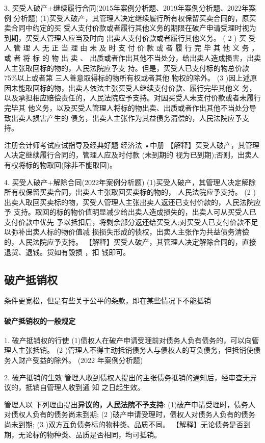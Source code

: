 \documentclass[UTF8,12pt]{ctexart}
\numberwithin{equation}{section} %
\numberwithin{figure}{section}
\numberwithin{table}{section}
\begin{document}
	3. 买受人破产+继续履行合同(2015年案例分析题、2019年案例分析题、2022年案例 分析题) 
	(1)买受人破产，其管理人决定继续履行所有权保留买卖合同的，原买卖合同中约定的买 受人支付价款或者履行其他义务的期限在破产申请受理时视为到期，买受人管理人应当及时向 出卖人支付价款或者履行其他义务。
	( 2 ) 买 受 人 管 理 人 无 正 当 理 由 未 及 时 支 付 价 款 或 者 履 行 完 毕 其 他 义 务 ，或 者 将 标 的 物 出 卖 、 出质或者作出其他不当处分，给出卖人造成损害，出卖人主张取回标的物的，人民法院应予支 持。但是，买受人已支付标的物总价款75\%以上或者第 三人善意取得标的物所有权或者其他 物权的除外。
	(3 )因上述原因未能取回标的物，出卖人依法主张买受人继续支付价款、履行完毕其他义 务，以及承担相应赔偿责任的，人民法院应予支持。对因买受人未支付价款或者未履行完毕其 他义务，以及买受人管理人将标的物出卖、出质或者作出其他不当处分导致出卖人损害产生的 债务，出卖人主张作为其益债务清偿的，人民法院应予支持。
	
	注册会计师考试应试指导及经典好题 经济法 •中册 【解释】买受人破产，其管理人决定继续履行合同的，管理人应及时付款 (未到期的 视为已到期);否则，出卖人有权将标的物取回(除非不能取回)。
	
	4. 买受人破产+解除合同(2022年案例分析题) 
	(1)买受人破产，其管理人决定解除所有权保留买卖合同，出卖人主张取回买卖标的物的， 人民法院应予支持。
	(2 )出卖人取回买卖标的物，买受人管理人主张出卖人返还已支付价款的，人民法院应予 支持。取回的标的物价值明显减少给出卖人造成损失的，出卖人可从买受人已支付价款中优先 予以抵扣后，将剩余部分返还给买受人;对买受人已支付价款不足以弥补出卖人标的物价值减 损损失形成的债权，出卖人主张作为共益债务清偿的，人民法院应予支持。
	【解释】买受人破产，其管理人决定解除合同的，直接退货、退钱。货如有毁损 ，扣 钱即可。
	
	\subsection{破产抵销权}
	条件更宽松，但是有些关于公平的条款，即在某些情况下不能抵销
	
	\paragraph{破产抵销权的一般规定}
	1. 破产抵销权的行使 
	(1)债权人在破产申请受理前对债务人负有债务的，可以向管理人主张抵销。
	(2 )管理人不得主动抵销债务人与债权人的互负债务，但抵销使债务人财产受益的除外。 (2022 年案例分析题)
	
	2. 破产抵销的生效 管理人收到债权人提出的主张债务抵销的通知后，经审查无异议的，抵销自管理人收到通 知 之日起生效。
	
	
	管理人以 下列理由提出\textbf{异议的，人民法院不予支持}: 
	(1)破产申请受理时，债务人对债权人负有的债务尚未到期;
	(2 )破产申请受理时，债权人对债务人负有的债务尚未到期;
	(3 )双方互负债务标的物种类、品质不同。
	【解释】无论债务是否到期，无论标的物种类、品质是否相同，均可抵销。
	
\end{document}
